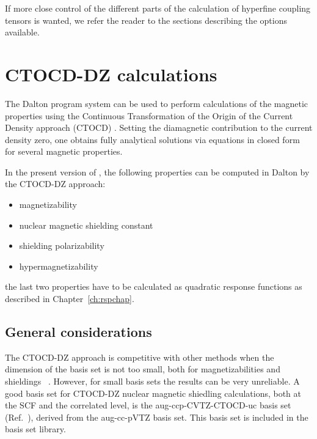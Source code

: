     If more close control of the different parts of the calculation
of hyperfine coupling tensors is wanted, we refer the reader to the
sections describing the options available.



\section{CTOCD-DZ calculations}\label{sec:ctocd}

The Dalton program system can be used to perform calculations of the magnetic 
properties using the Continuous Transformation of the Origin of the Current Density
approach (CTOCD) . Setting the diamagnetic contribution 
to the current density zero, one obtains fully analytical solutions via equations 
in closed form for several magnetic properties. 


In the present version of \dalton , the following properties can be computed in Dalton by the CTOCD-DZ approach:

\begin{center}
\begin{itemize}{}{}
\item magnetizability
\item nuclear magnetic shielding constant
\item shielding polarizability
\item hypermagnetizability
\end{itemize}
\end{center}
the last two properties have to be calculated as quadratic response functions as described 
in Chapter~\ref{ch:rspchap}.

\subsection{General considerations}\label{sec:ctocdgeneral}

The CTOCD-DZ approach is competitive with other methods when the dimension
of the basis set is not too small, both for magnetizabilities and
shieldings ~\cite{ctocd}. However, for small basis sets the results can be 
very unreliable. A good basis set for CTOCD-DZ nuclear magnetic shiedling 
calculations, both at the SCF and the correlated level, is the aug-ccp-CVTZ-CTOCD-uc
basis set (Ref.~\cite{ctocd}), derived from the aug-cc-pVTZ basis set.  
This basis set is included in the basis set library.

